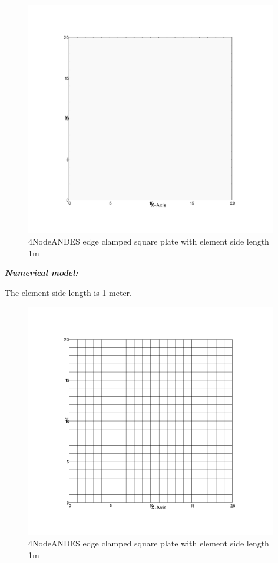 \documentclass[fleqn,11pt,letter]{article}
\begin{document}
\begin{figure}[H]
  \centering
  \includegraphics[width=11cm]{../Figure_files/4NodeANDES/square_plate_descrp.pdf}
  \caption{4NodeANDES edge clamped square plate with element side length 1m }
  \label{fig 4NodeANDES edges clamped square plate with element side length 1m }
\end{figure}


\newpage
\noindent \emph{\textbf{Numerical model:}}

The element side length is 1 meter. 


\begin{figure}[H]
  \centering
  \includegraphics[width=11cm]{../Figure_files/4NodeANDES/square_plate4.png}
  \caption{4NodeANDES edge clamped square plate with element side length 1m }
  \label{fig 4NodeANDES edges clamped square plate with element side length 1m }
\end{figure}
\end{document}
